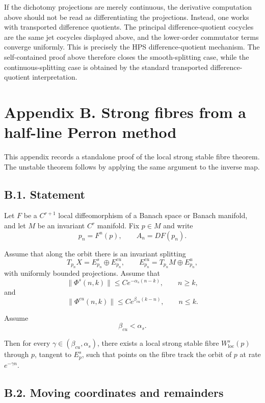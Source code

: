 \documentclass[12pt,a4paper]{article}
\theoremstyle{plain}
\numberwithin{equation}{section}
\numberwithin{theorem}{section}
\begin{document}
If the dichotomy projections are merely continuous, the derivative computation above should not be read as differentiating the projections. Instead, one works with transported difference quotients. The principal difference-quotient cocycles are the same jet cocycles displayed above, and the lower-order commutator terms converge uniformly. This is precisely the HPS difference-quotient mechanism. The self-contained proof above therefore closes the smooth-splitting case, while the continuous-splitting case is obtained by the standard transported difference-quotient interpretation.

\clearpage

\section{Appendix B. Strong fibres from a half-line Perron method}

This appendix records a standalone proof of the local strong stable fibre theorem. The unstable theorem follows by applying the same argument to the inverse map.

\subsection{B.1. Statement}

Let $F$ be a $C^{r+1}$ local diffeomorphism of a Banach space or Banach manifold, and let $M$ be an invariant $C^r$ manifold. Fix $p\in M$ and write
\[
p_n=F^n(p),
\qquad A_n=DF(p_n).
\]

Assume that along the orbit there is an invariant splitting
\[
T_{p_n}X=E^s_{p_n}\oplus E^{cu}_{p_n},
\qquad
E^{cu}_{p_n}=T_{p_n}M\oplus E^u_{p_n},
\]
with uniformly bounded projections. Assume that
\[
\|\Phi^s(n,k)\|\le C e^{-\alpha_s(n-k)},
\qquad n\ge k,
\]
and
\[
\|\Phi^{cu}(n,k)\|\le C e^{\beta_{cu}(k-n)},
\qquad n\le k.
\]

Assume
\[
\beta_{cu}<\alpha_s.
\]

Then for every $\gamma\in(\beta_{cu},\alpha_s)$, there exists a local strong stable fibre $W^s_{\mathrm{loc}}(p)$ through $p$, tangent to $E^s_p$, such that points on the fibre track the orbit of $p$ at rate $e^{-\gamma n}$.

\subsection{B.2. Moving coordinates and remainders}
\end{document}
